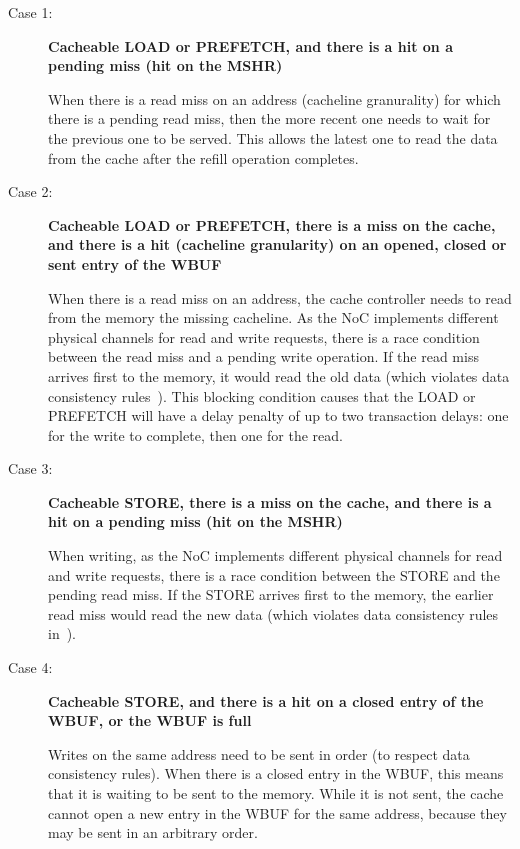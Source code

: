 \documentclass[10pt,titlepage,twoside]{book}
\begin{document}
\begin{description}
  \item[Case 1:] \textbf{Cacheable LOAD or PREFETCH, and there is a hit on a pending miss (hit on the \acs{MSHR})}

When there is a read miss on an address (cacheline granurality) for which there is a pending read miss, then the more recent one needs to wait for the previous one to be served.
This allows the latest one to read the data from the cache after the refill operation completes.

  \item[Case 2:] \textbf{Cacheable LOAD or PREFETCH, there is a miss on the cache, and there is a hit (cacheline granularity) on an opened, closed or sent entry of the \ac{WBUF}}

When there is a read miss on an address, the cache controller needs to read from the memory the missing cacheline.
As the \ac{NoC} implements different physical channels for read and write requests, there is a race condition between the read miss and a pending write operation.
If the read miss arrives first to the memory, it would read the old data (which violates data consistency rules~).
This blocking condition causes that the LOAD or PREFETCH will have a delay penalty of up to two transaction delays: one for the write to complete, then one for the read.

  \item[Case 3:] \textbf{Cacheable STORE, there is a miss on the cache, and there is a hit on a pending miss (hit on the \acs{MSHR})}

When writing, as the \ac{NoC} implements different physical channels for read and write requests, there is a race condition between the STORE and the pending read miss.
If the STORE arrives first to the memory, the earlier read miss would read the new data (which violates data consistency rules in~).

  \item[Case 4:] \textbf{Cacheable STORE, and there is a hit on a closed entry of the \ac{WBUF}, or the \ac{WBUF} is full}

Writes on the same address need to be sent in order (to respect data consistency rules).
When there is a closed entry in the \ac{WBUF}, this means that it is waiting to be sent to the memory.
While it is not sent, the cache cannot open a new entry in the \ac{WBUF} for the same address, because they may be sent in an arbitrary order.


\end{description}
\end{document}
